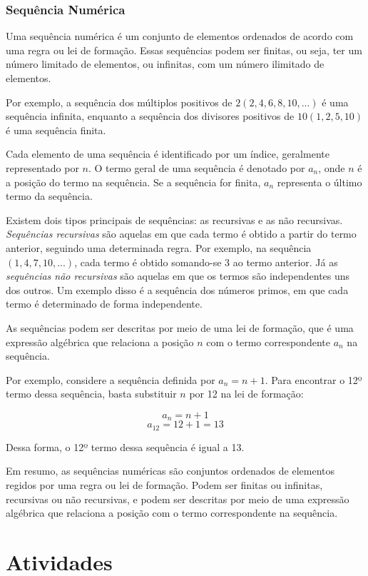 {\subsubsection{Sequência Numérica}

Uma sequência numérica é um conjunto de elementos ordenados de acordo com uma
regra ou lei de formação. Essas sequências podem ser finitas, ou seja, ter um
número limitado de elementos, ou infinitas, com um número ilimitado de
elementos.

Por exemplo, a sequência dos múltiplos positivos de $2 (2, 4, 6, 8, 10, ...)$ é
uma sequência infinita, enquanto a sequência dos divisores positivos de $10
(1, 2, 5, 10)$ é uma sequência finita.

Cada elemento de uma sequência é identificado por um índice, geralmente
representado por $n$. O termo geral de uma sequência é denotado por $a_n$,
onde $n$ é a posição do termo na sequência. Se a sequência for finita, $a_n$
representa o último termo da sequência.

Existem dois tipos principais de sequências: as recursivas e as não
recursivas. \textit{Sequências recursivas} são aquelas em que cada termo é obtido a
partir do termo anterior, seguindo uma determinada regra. Por exemplo, na
sequência $(1, 4, 7, 10, ...)$, cada termo é obtido somando-se 3 ao termo
anterior. Já as \textit{sequências não recursivas} são aquelas em que os termos são
independentes uns dos outros. Um exemplo disso é a sequência dos números
primos, em que cada termo é determinado de forma independente.

As sequências podem ser descritas por meio de uma lei de formação, que é uma
expressão algébrica que relaciona a posição $n$ com o termo
correspondente $a_n$ na sequência.

Por exemplo, considere a sequência definida por $a_n = n + 1$. Para encontrar
o 12º termo dessa sequência, basta substituir $n$ por 12 na lei de formação:

$$a_n = n + 1$$
$$a_12 = 12 + 1 = 13$$

Dessa forma, o 12º termo dessa sequência é igual a 13.

Em resumo, as sequências numéricas são conjuntos ordenados de elementos
regidos por uma regra ou lei de formação. Podem ser finitas ou infinitas,
recursivas ou não recursivas, e podem ser descritas por meio de uma expressão
algébrica que relaciona a posição com o termo correspondente na sequência.
}

\section*{Atividades}

